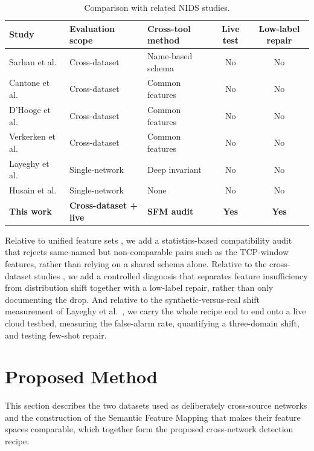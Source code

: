 \documentclass[11pt,a4paper]{article}
\begin{document}
\begin{table}[htbp]
\centering
\caption{Comparison with related NIDS studies.}
\label{tab:related}
\footnotesize
\begin{tabular}{lllcc}
\toprule
Study & Evaluation scope & Cross-tool method & Live test & Low-label repair \\
\midrule
Sarhan et al.\ \cite{sarhan,sarhannf}        & Cross-dataset   & Name-based schema      & No  & No  \\
Cantone et al.\ \cite{cantone}               & Cross-dataset   & Common features        & No  & No  \\
D'Hooge et al.\ \cite{dhooge}                & Cross-dataset   & Common features        & No  & No  \\
Verkerken et al.\ \cite{verkerken}           & Cross-dataset   & Common features        & No  & No  \\
Layeghy et al.\ \cite{layeghy}               & Single-network  & Deep invariant         & No  & No  \\
Husain et al.\ \cite{husain}                 & Single-network  & None                   & No  & No  \\
\textbf{This work}                           & \textbf{Cross-dataset + live} & \textbf{SFM audit} & \textbf{Yes} & \textbf{Yes} \\
\bottomrule
\end{tabular}
\end{table}

\noindent Relative to unified feature sets \cite{sarhan,sarhannf}, we add a
statistics-based compatibility audit that rejects same-named but non-comparable pairs
such as the TCP-window features, rather than relying on a shared schema alone.
Relative to the cross-dataset studies \cite{cantone,dhooge,verkerken}, we add a
controlled diagnosis that separates feature insufficiency from distribution shift
together with a low-label repair, rather than only documenting the drop. And relative
to the synthetic-versus-real shift measurement of Layeghy et al.\ \cite{layeghy}, we
carry the whole recipe end to end onto a live cloud testbed, measuring the false-alarm
rate, quantifying a three-domain shift, and testing few-shot repair.

\section{Proposed Method}
This section describes the two datasets used as deliberately cross-source networks and
the construction of the Semantic Feature Mapping that makes their feature spaces
comparable, which together form the proposed cross-network detection recipe.
\end{document}
